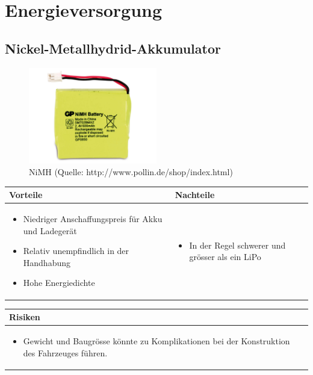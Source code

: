 
\section{Energieversorgung}


\subsection{Nickel-Metallhydrid-Akkumulator}


\begin{figure}[h!]%
\centering
\includegraphics[width=0.5\textwidth]{fig/NiMH.JPG}
\caption{NiMH (Quelle: http://www.pollin.de/shop/index.html)}
\label{fig:Java}
\end{figure}

\begin{table}[h]
\begin{tabular}{p{} | p{}}


 \textbf{Vorteile} & \textbf{Nachteile} \\ \hline
	 
\begin{itemize}
\item Niedriger Anschaffungspreis für Akku und Ladegerät
\item Relativ unempfindlich in der Handhabung
\item Hohe Energiedichte
\end{itemize}

 
 &
 
\begin{itemize}
\item In der Regel schwerer und grösser als ein LiPo
\end{itemize}

\end{tabular}
\end{table}

\begin{table}[h]
\begin{tabular}{p{}p{}}


 \textbf{Risiken} & \\ \hline
	 
\begin{itemize}
\item Gewicht und Baugrösse könnte zu Komplikationen bei der Konstruktion des Fahrzeuges führen.
\end{itemize}

 
\end{tabular}
\end{table}

